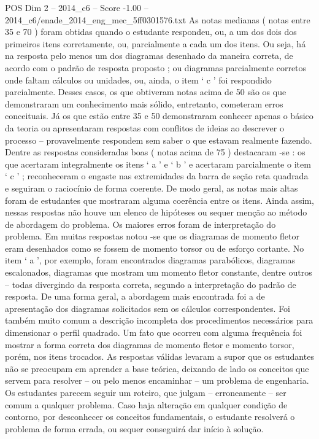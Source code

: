 \begin{textsample}{POS Dim 2 – 2014\_c6 – Score -1.00 – 2014\_c6/enade\_2014\_eng\_mec\_5ff0301576.txt}
As notas medianas ( notas entre 35 e 70 ) foram obtidas quando o estudante respondeu, ou, a um dos dois dos primeiros itens corretamente, ou, parcialmente a cada um dos itens.
Ou seja, há na resposta pelo menos um dos diagramas desenhado da maneira correta, de acordo com o padrão de resposta proposto ; ou diagramas parcialmente corretos onde faltam cálculos ou unidades, ou, ainda, o item ‘ c ’ foi respondido parcialmente.
Desses casos, os que obtiveram notas acima de 50 são os que demonstraram um conhecimento mais sólido, entretanto, cometeram erros conceituais.
Já os que estão entre 35 e 50 demonstraram conhecer apenas o básico da teoria ou apresentaram respostas com conflitos de ideias ao descrever o processo – provavelmente respondem sem saber o que estavam realmente fazendo.
Dentre as respostas consideradas boas ( notas acima de 75 ) destacaram -se : os que acertaram integralmente os itens ‘ a ’ e ‘ b ’ e acertaram parcialmente o item ‘ c ’ ; reconheceram o engaste nas extremidades da barra de seção reta quadrada e seguiram o raciocínio de forma coerente.
De modo geral, as notas mais altas foram de estudantes que mostraram alguma coerência entre os itens.
Ainda assim, nessas respostas não houve um elenco de hipóteses ou sequer menção ao método de abordagem do problema.
Os maiores erros foram de interpretação do problema.
Em muitas respostas notou -se que os diagramas de momento fletor eram desenhados como se fossem de momento torsor ou de esforço cortante.
No item ‘ a ’, por exemplo, foram encontrados diagramas parabólicos, diagramas escalonados, diagramas que mostram um momento fletor constante, dentre outros – todas divergindo da resposta correta, segundo a interpretação do padrão de resposta.
De uma forma geral, a abordagem mais encontrada foi a de apresentação dos diagramas solicitados sem os cálculos correspondentes.
Foi também muito comum a descrição incompleta dos procedimentos necessários para dimensionar o perfil quadrado.
Um fato que ocorreu com alguma frequência foi mostrar a forma correta dos diagramas de momento fletor e momento torsor, porém, nos itens trocados.
As respostas válidas levaram a supor que os estudantes não se preocupam em aprender a base teórica, deixando de lado os conceitos que servem para resolver – ou pelo menos encaminhar – um problema de engenharia.
Os estudantes parecem seguir um roteiro, que julgam – erroneamente – ser comum a qualquer problema.
Caso haja alteração em qualquer condição de contorno, por desconhecer os conceitos fundamentais, o estudante resolverá o problema de forma errada, ou sequer conseguirá dar início à solução.

\end{textsample}
